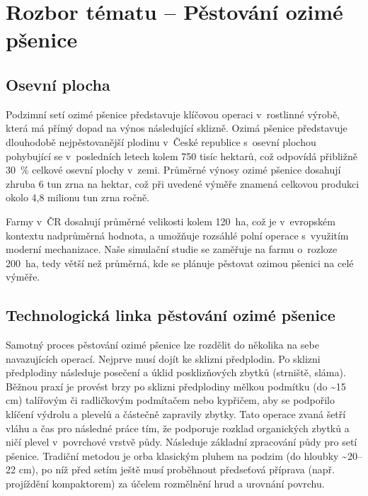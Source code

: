 \documentclass[11pt,a4paper]{article}
\begin{document}
\section{Rozbor tématu -- Pěstování ozimé pšenice}\label{sec:rozbor-tematu}

\subsection{Osevní plocha}

Podzimní setí ozimé pšenice představuje klíčovou operaci v~rostlinné výrobě, která má přímý dopad na výnos následující sklizně. Ozimá pšenice představuje dlouhodobě nejpěstovanější plodinu v~České republice s~osevní plochou pohybující se v~posledních letech kolem 750 tisíc hektarů\cite{čsú-plocha-pšenice}, což odpovídá přibližně 30~\% celkové osevní plochy v~zemi\cite{čsú-plocha-celkově}. Průměrné výnosy ozimé pšenice dosahují zhruba 6 tun zrna na hektar\cite{agromanuál-výnos-tun-na-hektar}, což při uvedené výměře znamená celkovou produkci okolo 4,8 milionu tun zrna ročně. 

Farmy v~ČR dosahují průměrné velikosti kolem 120~ha\cite{zsčr-zpráva}, což je v~evropském kontextu nadprůměrná hodnota, a umožňuje rozsáhlé polní operace s~využitím moderní mechanizace. Naše simulační studie se zaměřuje na farmu o~rozloze 200~ha, tedy větší než průměrná, kde se plánuje pěstovat ozimou pšenici na celé výměře. %

\subsection{Technologická linka pěstování ozimé pšenice}\label{technologicka-linka-pestovani-ozime-psenice}

Samotný proces pěstování ozimé pšenice lze rozdělit do několika na sebe navazujících operací. Nejprve musí dojít ke sklizni předplodin. Po sklizni předplodiny následuje posečení a úklid posklizňových zbytků (strniště, sláma). Běžnou praxí je provést brzy po sklizni předplodiny mělkou podmítku (do \textasciitilde15 cm)\cite{eos-pěstování-pšenice-ozimé} talířovým či radličkovým podmítačem nebo kypřičem, aby se podpořilo klíčení výdrolu a plevelů a částečně zapravily zbytky. Tato operace zvaná  šetří vláhu a čas pro následné práce tím, že podporuje rozklad organických zbytků a ničí plevel v~povrchové vrstvě půdy. Následuje základní zpracování půdy pro setí pšenice. Tradiční metodou je orba klasickým pluhem na podzim (do hloubky \textasciitilde20--22 cm)\cite{agkaizen-pšenice-ozimá}, po níž před setím ještě musí proběhnout předseťová příprava (např. projíždění kompaktorem) za účelem rozmělnění hrud a urovnání povrchu. 
\end{document}
